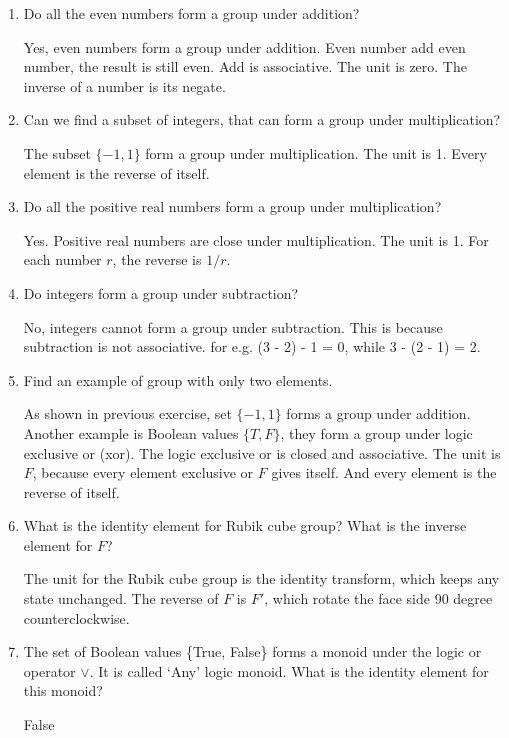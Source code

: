 \documentclass[UTF8]{article}
\begin{document}
\begin{enumerate}
\item {Do all the even numbers form a group under addition?}

Yes, even numbers form a group under addition. Even number add even number, the result is still even. Add is associative. The unit is zero. The inverse of a number is its negate.

\item {Can we find a subset of integers, that can form a group under multiplication?}

The subset $\{ -1, 1 \}$ form a group under multiplication. The unit is 1. Every element is the reverse of itself.

\item {Do all the positive real numbers form a group under multiplication?}

Yes. Positive real numbers are close under multiplication. The unit is 1. For each number $r$, the reverse is $1/r$.

\item {Do integers form a group under subtraction?}

No, integers cannot form a group under subtraction. This is because subtraction is not associative. for e.g. (3 - 2) - 1 = 0, while 3 - (2 - 1) = 2.

\item {Find an example of group with only two elements.}

As shown in previous exercise, set $\{-1, 1\}$ forms a group under addition. Another example is Boolean values $\{T, F\}$, they form a group under logic exclusive or (xor). The logic exclusive or is closed and associative. The unit is $F$, because every element exclusive or $F$ gives itself. And every element is the reverse of itself.

\item {What is the identity element for Rubik cube group? What is the inverse element for $F$?}

The unit for the Rubik cube group is the identity transform, which keeps any state unchanged. The reverse of $F$ is $F'$, which rotate the face side 90 degree counterclockwise.

\item {The set of Boolean values \{True, False\} forms a monoid under the logic or operator $\lor$. It is called `Any' logic monoid. What is the identity element for this monoid?}

False


\end{enumerate}
\end{document}
